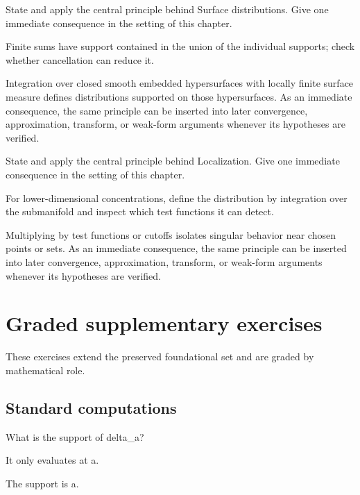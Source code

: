\begin{exercise}\label{exr:iii17-07}
State and apply the central principle behind Surface distributions. Give one immediate consequence in the setting of this chapter.
\end{exercise}
\begin{hint}
Finite sums have support contained in the union of the individual supports; check whether cancellation can reduce it.
\end{hint}
\begin{solution}
Integration over closed smooth embedded hypersurfaces with locally finite surface measure defines distributions supported on those hypersurfaces. As an immediate consequence, the same principle can be inserted into later convergence, approximation, transform, or weak-form arguments whenever its hypotheses are verified.
\end{solution}

\begin{exercise}\label{exr:iii17-08}
State and apply the central principle behind Localization. Give one immediate consequence in the setting of this chapter.
\end{exercise}
\begin{hint}
For lower-dimensional concentrations, define the distribution by integration over the submanifold and inspect which test functions it can detect.
\end{hint}
\begin{solution}
Multiplying by test functions or cutoffs isolates singular behavior near chosen points or sets. As an immediate consequence, the same principle can be inserted into later convergence, approximation, transform, or weak-form arguments whenever its hypotheses are verified.
\end{solution}


\section{Graded supplementary exercises}
These exercises extend the preserved foundational set and are graded by mathematical role.

\subsection*{Standard computations}

\begin{exercise}\label{exr:iii17-expand-01}
What is the support of delta\_a?
\end{exercise}
\begin{hint}
It only evaluates at a.
\end{hint}
\begin{solution}
The support is {a}.
\end{solution}

